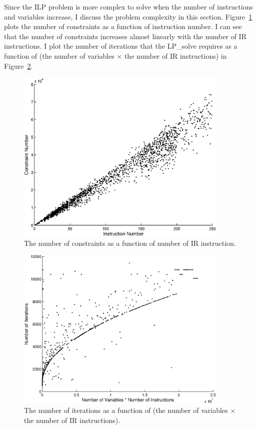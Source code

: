 Since the ILP problem is more complex to solve when the number of
instructions and variables increase, I discuss the problem complexity
in this section. Figure~\ref{fexp.inst.con} plots the number of
constraints as a function of instruction number. I can see that the
number of constraints increases almost linearly with the number of IR
instructions. I plot the number of iterations that the LP\_solve
\cite{lpsolve} requires as a function of (the number of variables
$\times$ the number of IR instructions) in Figure~\ref{fexp.iter.con}.
\begin{figure}[htbp]
\centering
\includegraphics[width=4in]{figures/inst-cons.eps}
\caption{The number of constraints as a function of number
of IR instruction.}
\label{fexp.inst.con}
\end{figure}
\begin{figure}[htbp]
\centering
\includegraphics[width=4in]{figures/iter_linear.eps}
\caption{The number of iterations as a function of 
(the number of variables $\times$ the number of IR instructions).}
\label{fexp.iter.con}
\end{figure}

